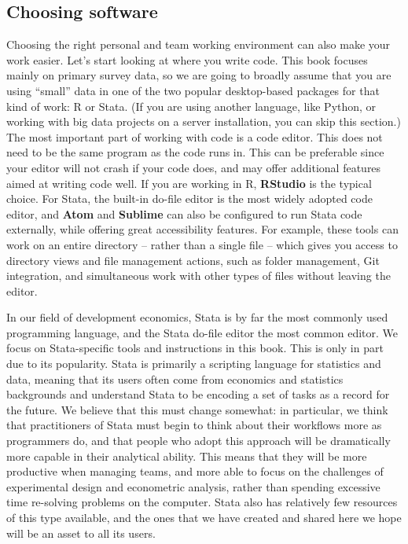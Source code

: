 \subsection{Choosing software}

Choosing the right personal and team working environment can also make your work easier.
Let's start looking at where you write code.
This book focuses mainly on primary survey data,
so we are going to broadly assume that you are using ``small'' data
in one of the two popular desktop-based packages for that kind of work: R or Stata.
(If you are using another language, like Python,
or working with big data projects on a server installation,
you can skip this section.)
The most important part of working with code is a code editor.
This does not need to be the same program as the code runs in.
This can be preferable since your editor will not crash if your code does,
and may offer additional features aimed at writing code well.
If you are working in R, \textbf{RStudio} is the typical choice.
For Stata, the built-in do-file editor is the most widely adopted code editor,
and \textbf{Atom} and \textbf{Sublime} can also be configured to run Stata code externally, while offering great accessibility features.
For example, these tools can work on an entire directory -- rather than a single file --
which gives you access to directory views and file management actions,
such as folder management, Git integration, and simultaneous work with other types of files without leaving the editor.

In our field of development economics,
Stata is by far the most commonly used programming language,
and the Stata do-file editor the most common editor.
We focus on Stata-specific tools and instructions in this book.
This is only in part due to its popularity.
Stata is primarily a scripting language for statistics and data,
meaning that its users often come from economics and statistics backgrounds
and understand Stata to be encoding a set of tasks as a record for the future.
We believe that this must change somewhat:
in particular, we think that practitioners of Stata
must begin to think about their workflows more as programmers do,
and that people who adopt this approach will be dramatically
more capable in their analytical ability.
This means that they will be more productive when managing teams,
and more able to focus on the challenges of experimental design
and econometric analysis, rather than spending excessive time
re-solving problems on the computer.
Stata also has relatively few resources of this type available,
and the ones that we have created and shared here
we hope will be an asset to all its users.

